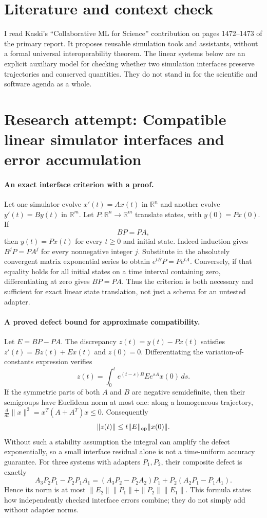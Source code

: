 \documentclass[11pt]{article}
\begin{document}
\section{Literature and context check}

I read Kaski's ``Collaborative ML for Science'' contribution on pages 1472--1473
of the primary report. It proposes reusable simulation tools and assistants,
without a formal universal interoperability theorem. The linear systems below
are an explicit auxiliary model for checking whether two simulation interfaces
preserve trajectories and conserved quantities. They do not stand in for the
scientific and software agenda as a whole.

\section{Research attempt: Compatible linear simulator interfaces and error accumulation}

\paragraph{An exact interface criterion with a proof.}
Let one simulator evolve $x'(t)=Ax(t)$ in $\mathbb R^n$ and another evolve
$y'(t)=By(t)$ in $\mathbb R^m$. Let $P:\mathbb R^n\to\mathbb R^m$
translate states, with $y(0)=Px(0)$.
If
\[
 BP=PA,
\]
then $y(t)=Px(t)$ for every $t\geq0$ and initial state.
Indeed induction gives $B^jP=PA^j$ for every nonnegative integer $j$.
Substitute in the absolutely convergent matrix exponential series to obtain
$e^{tB}P=Pe^{tA}$.
Conversely, if that equality holds for all initial states on a time interval
containing zero, differentiating at zero gives $BP=PA$.
Thus the criterion is both necessary and sufficient for exact linear state
translation, not just a schema for an untested adapter.

\paragraph{A proved defect bound for approximate compatibility.}
Let $E=BP-PA$. The discrepancy $z(t)=y(t)-Px(t)$ satisfies
$z'(t)=Bz(t)+Ex(t)$ and $z(0)=0$.
Differentiating the variation-of-constants expression verifies
\[
 z(t)=\int_0^t e^{(t-s)B}E e^{sA}x(0)\,ds.
\]
If the symmetric parts of both $A$ and $B$ are negative semidefinite, then
their semigroups have Euclidean norm at most one: along a homogeneous
trajectory, $\frac{d}{dt}\|x\|^2=x^T(A+A^T)x\leq0$.
Consequently
\[
 \|z(t)\|\leq t\|E\|_{\rm op}\|x(0)\|.
\]
Without such a stability assumption the integral can amplify the defect
exponentially, so a small interface residual alone is not a time-uniform
accuracy guarantee.
For three systems with adapters $P_1,P_2$, their composite defect is exactly
\[
 A_3P_2P_1-P_2P_1A_1
 =(A_3P_2-P_2A_2)P_1+P_2(A_2P_1-P_1A_1).
\]
Hence its norm is at most
$\|E_2\|\|P_1\|+\|P_2\|\|E_1\|$. This formula states how independently
checked interface errors combine; they do not simply add without adapter norms.
\end{document}

